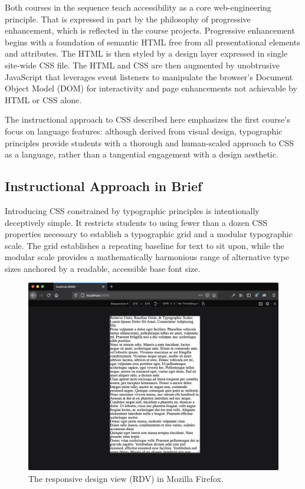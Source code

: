 \documentclass[sigplan,screen]{acmart}
\begin{document}
Both courses in the sequence teach accessibility as a core web-engineering principle. That is expressed in part by the philosophy of progressive enhancement, which is reflected in the course projects. Progressive enhancement begins with a foundation of semantic HTML free from all presentational elements and attributes. The HTML is then styled by a design layer expressed in single site-wide CSS file. The HTML and CSS are then augmented by unobtrusive JavaScript that leverages event listeners to manipulate the browser’s Document Object Model (DOM) for interactivity and page enhancements not achievable by HTML or CSS alone.

The instructional approach to CSS described here emphasizes the first course’s focus on language features: although derived from visual design, typographic principles provide students with a thorough and human-scaled approach to CSS as a language, rather than a tangential engagement with a design aesthetic.

\subsection{Instructional Approach in Brief}

Introducing CSS constrained by typographic principles is intentionally deceptively simple. It restricts students to using fewer than a dozen CSS properties necessary to establish a typographic grid and a modular typographic scale. The grid establishes a repeating baseline for text to sit upon, while the modular scale provides a mathematically harmonious range of alternative type sizes anchored by a readable, accessible base font size.

\begin{figure}
  \includegraphics[width=\linewidth]{rdv}
  \caption{The responsive design view (RDV) in Mozilla Firefox.}
  \label{fig:rdv}
\end{figure}
\end{document}
